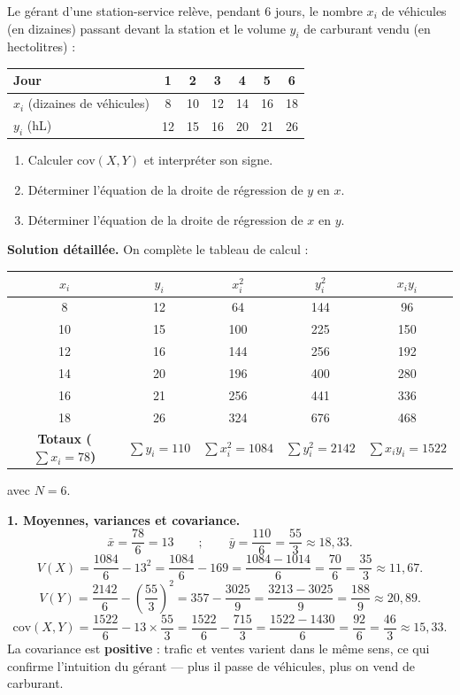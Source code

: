 \documentclass[11pt]{article}
\begin{document}
\begin{exoresolu}
Le gérant d'une station-service relève, pendant 6 jours, le nombre $x_i$ de véhicules (en dizaines) passant devant la station et le volume $y_i$ de carburant vendu (en hectolitres) :
\begin{center}
\begin{tabular}{|l|*{6}{c|}}
\hline
\rowcolor{popblueL} Jour & 1 & 2 & 3 & 4 & 5 & 6 \\
\hline
$x_i$ (dizaines de véhicules) & 8 & 10 & 12 & 14 & 16 & 18 \\
\hline
$y_i$ (hL) & 12 & 15 & 16 & 20 & 21 & 26 \\
\hline
\end{tabular}
\end{center}
\begin{enumerate}
\item Calculer $\mathrm{cov}(X,Y)$ et interpréter son signe.
\item Déterminer l'équation de la droite de régression de $y$ en $x$.
\item Déterminer l'équation de la droite de régression de $x$ en $y$.
\end{enumerate}
\tcblower
\textbf{Solution détaillée.} On complète le tableau de calcul :
\begin{center}
\begin{tabular}{|c|c|c|c|c|}
\hline
\rowcolor{popblueL} $x_i$ & $y_i$ & $x_i^2$ & $y_i^2$ & $x_i y_i$ \\
\hline
8 & 12 & 64 & 144 & 96 \\
10 & 15 & 100 & 225 & 150 \\
12 & 16 & 144 & 256 & 192 \\
14 & 20 & 196 & 400 & 280 \\
16 & 21 & 256 & 441 & 336 \\
18 & 26 & 324 & 676 & 468 \\
\hline
\rowcolor{popcream} \textbf{Totaux ($\sum x_i=78$)} & $\sum y_i=110$ & $\sum x_i^2=1084$ & $\sum y_i^2=2142$ & $\sum x_i y_i=1522$ \\
\hline
\end{tabular}
\end{center}
avec $N=6$.

\textbf{1. Moyennes, variances et covariance.}
\[
\bar{x}=\frac{78}{6}=13 \qquad ; \qquad \bar{y}=\frac{110}{6}=\frac{55}{3}\approx 18{,}33.
\]
\[
V(X)=\frac{1084}{6}-13^2=\frac{1084}{6}-169=\frac{1084-1014}{6}=\frac{70}{6}=\frac{35}{3}\approx 11{,}67.
\]
\[
V(Y)=\frac{2142}{6}-\left(\frac{55}{3}\right)^2=357-\frac{3025}{9}=\frac{3213-3025}{9}=\frac{188}{9}\approx 20{,}89.
\]
\[
\mathrm{cov}(X,Y)=\frac{1522}{6}-13\times\frac{55}{3}=\frac{1522}{6}-\frac{715}{3}=\frac{1522-1430}{6}=\frac{92}{6}=\frac{46}{3}\approx 15{,}33.
\]
La covariance est \textbf{positive} : trafic et ventes varient dans le même sens, ce qui confirme l'intuition du gérant — plus il passe de véhicules, plus on vend de carburant.


\end{exoresolu}
\end{document}
